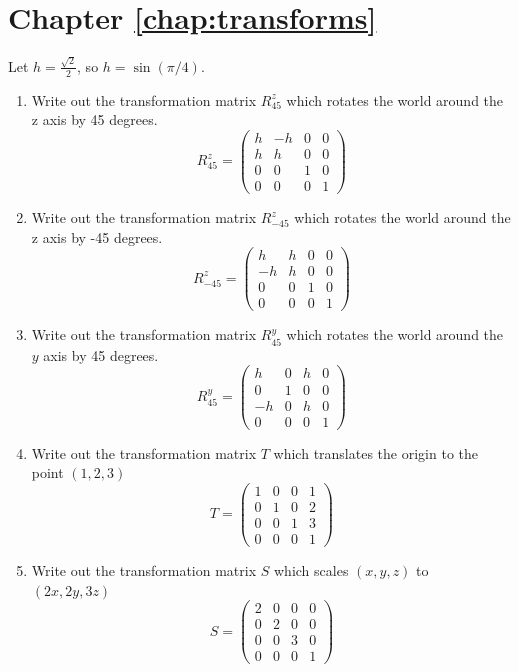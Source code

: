 \documentclass{book}
\begin{document}
\section{Chapter \ref{chap:transforms}}

Let $h = \frac{\sqrt{2}}{2}$, so $h = \sin(\pi/4)$.
\begin{enumerate}
\item Write out the transformation matrix $R^z_{45}$ which rotates the world around the z axis by 45 degrees.
\[
R^z_{45} =
\left (
\begin{array}{cccc}
h & -h & 0 & 0 \\
h & h & 0 & 0 \\
0 & 0 & 1 & 0 \\
0 & 0 & 0 & 1
\end{array}
\right )
\]
\item Write out the transformation matrix $R^z_{-45}$ which rotates the world around the z axis by -45 degrees.
\[
R^z_{-45} =
\left (
\begin{array}{cccc}
h & h & 0 & 0 \\
-h & h & 0 & 0 \\
0 & 0 & 1 & 0 \\
0 & 0 & 0 & 1
\end{array}
\right )
\]
\item Write out the transformation matrix $R^y_{45}$ which rotates the world around the $y$ axis by 45 degrees.
\[
R^y_{45} =
\left (
\begin{array}{cccc}
 h & 0 & h & 0 \\
 0 & 1 & 0 & 0 \\
-h & 0 & h & 0 \\
 0 & 0 & 0 & 1
\end{array}
\right )
\]
\item Write out the transformation matrix $T$ which translates the origin to the point $(1, 2, 3)$
\[
T =
\left (
\begin{array}{cccc}
1 & 0 & 0 & 1 \\
0 & 1 & 0 & 2 \\
0 & 0 & 1 & 3 \\
0 & 0 & 0 & 1
\end{array}
\right )
\]
\item Write out the transformation matrix $S$ which scales $(x,y,z)$ to $(2x, 2y, 3z)$
\[
S =
\left (
\begin{array}{cccc}
2 & 0 & 0 & 0 \\
0 & 2 & 0 & 0 \\
0 & 0 & 3 & 0 \\
0 & 0 & 0 & 1
\end{array}
\right )
\]



\end{enumerate}
\end{document}
